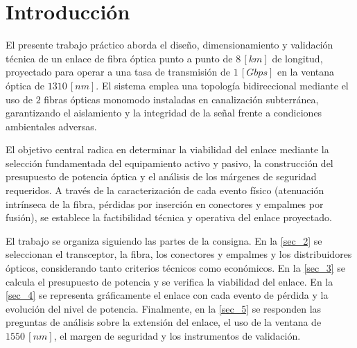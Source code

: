 \documentclass[12pt]{article}
\begin{document}
\tableofcontents
\newpage
\listoffigures
\newpage
\listoftables
\newpage

\section{Introducción}
\label{sec_1}
El presente trabajo práctico aborda el diseño, dimensionamiento y validación técnica de un enlace de fibra óptica punto a punto de $8 \, [km]$ de longitud, proyectado para operar a una tasa de transmisión de $1 \, [Gbps]$ en la ventana óptica de $1310 \, [nm]$. El sistema emplea una topología bidireccional mediante el uso de $2$ fibras ópticas monomodo instaladas en canalización subterránea, garantizando el aislamiento y la integridad de la señal frente a condiciones ambientales adversas.

El objetivo central radica en determinar la viabilidad del enlace mediante la selección fundamentada del equipamiento activo y pasivo, la construcción del presupuesto de potencia óptica y el análisis de los márgenes de seguridad requeridos. A través de la caracterización de cada evento físico (atenuación intrínseca de la fibra, pérdidas por inserción en conectores y empalmes por fusión), se establece la factibilidad técnica y operativa del enlace proyectado.

El trabajo se organiza siguiendo las partes de la consigna. En la \autoref{sec_2} se seleccionan el transceptor, la fibra, los conectores y empalmes y los distribuidores ópticos, considerando tanto criterios técnicos como económicos. En la \autoref{sec_3} se calcula el presupuesto de potencia y se verifica la viabilidad del enlace. En la \autoref{sec_4} se representa gráficamente el enlace con cada evento de pérdida y la evolución del nivel de potencia. Finalmente, en la \autoref{sec_5} se responden las preguntas de análisis sobre la extensión del enlace, el uso de la ventana de $1550 \, [nm]$, el margen de seguridad y los instrumentos de validación.



\newpage




\newpage




\newpage




\newpage
\end{document}
